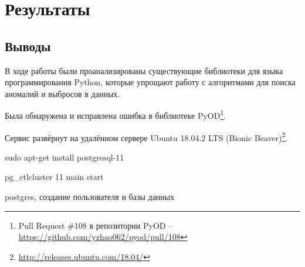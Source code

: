 \chapter{Результаты} \label{ch:ch5}

\section{Выводы} \label{ch:ch5/sect1}

В ходе работы были проанализированы существующие библиотеки для языка программирования Python, которые упрощают работу с алгоритмами для поиска аномалий и выбросов в данных.

Была обнаружена и исправлена ошибка в библиотеке PyOD\footnote{Pull Request \#108 в репозитории PyOD -- \url{https://github.com/yzhao062/pyod/pull/108}}.

Сервис развёрнут на удалённом сервере Ubuntu 18.04.2 LTS (Bionic Beaver)\footnote{\url{http://releases.ubuntu.com/18.04/}}.

sudo apt-get install postgresql-11

pg\_ctlcluster 11 main start

postgres, создание пользователя и базы данных

\clearpage